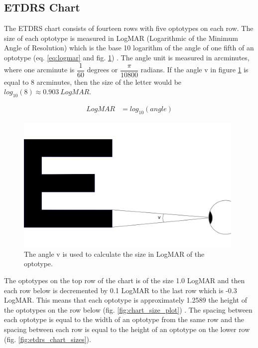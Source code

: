 \documentclass[12pt,a4paper,notitlepage]{report}
\begin{document}
\subsection{ETDRS Chart}
The ETDRS chart consists of fourteen rows with five optotypes on each row. The size of each optotype is measured in LogMAR (Logarithmic of the Minimum Angle of Resolution) which is the base 10 logarithm of the angle of one fifth of an optotype (eq. \ref{eq:logmar} and fig. \ref{fig:logmar_calculation}) \cite{Bailey}. The angle unit is measured in arcminutes, where one arcminute is $\dfrac{1}{60}$ degrees or $\dfrac{\pi}{10800}$ radians. If the angle v in figure \ref{fig:logmar_calculation} is equal to 8 arcminutes, then the size of the letter would be $log_{10}(8) \approx 0.903\ LogMAR$.


\begin{equation}
	\begin{split}
  		LogMAR & = log_{10}(angle)
  	\end{split}
  	\label{eq:logmar}
\end{equation}

\begin{figure}[ht!]
\centering
\includegraphics[width=110mm]{images/logmar_calculation.png}
\caption{The angle v is used to calculate the size in LogMAR of the optotype.\label{fig:logmar_calculation}}
\end{figure} 

The optotypes on the top row of the chart is of the size 1.0 LogMAR and then each row below is decremented by 0.1 LogMAR to the last row which is -0.3 LogMAR. This means that each optotype is approximately 1.2589 the height of the optotypes on the row below (fig. \ref{fig:chart_size_plot}) \cite{Ferris}. The spacing between each optotype is equal to the width of an optotype from the same row and the spacing between each row is equal to the height of an optotype on the lower row (fig. \ref{fig:etdrs_chart_sizes}).
\end{document}
